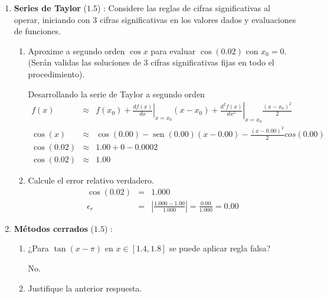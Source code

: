 \documentclass[12pt]{article}
\renewcommand{\sin}{\operatorname{sen}}
\DeclareMathOperator{\sen}{sen}
\renewcommand{\sin}{\sen}
\begin{document}
  \begin{enumerate}[leftmargin=*,widest=9]
    \item \textbf{Series de Taylor} ($1.5$) : Considere las reglas de cifras significativas al operar, iniciando con 3 cifras significativas en los valores dados y evaluaciones de funciones.
    
    \begin{enumerate}[label=\alph*]
    \item Aproxime a segundo orden $\cos x$ para evaluar $\cos (0.02)$ con $x_0 = 0$. 
    (Serán validas las soluciones de 3 cifras significativas fijas en todo el procedimiento).
    
    Desarrollando la serie de Taylor a segundo orden
    \begin{eqnarray*}
    f(x) & \approx & f(x_0) + \left.\frac{df(x)}{dx}\right|_{x=x_0}(x-x_0)+ \left.\frac{d^2f(x)}{dx^2}\right|_{x=x_0}\frac{(x-x_0)^2}{2}\\
    \cos(x) & \approx & \cos(0.00) - \sin(0.00)(x-0.00) - \frac{(x - 0.00)^2}{2}cos(0.00) \\
    \cos(0.02) & \approx & 1.00 + 0 - 0.0002\\
    \cos(0.02) & \approx & 1.00
    \end{eqnarray*}
    
    \item Calcule el error relativo verdadero.
    \begin{eqnarray*}
    \cos(0.02) & = & 1.000\\
    \epsilon_r & = & \left| \frac{1.000 - 1.00}{1.000} \right| = \frac{0.00}{1.000} = 0.00  
    \end{eqnarray*}
    
    \end{enumerate}

    \item \textbf{Métodos cerrados} ($1.5$) :
    
    \begin{enumerate}[label=\alph*]
    \item ¿Para $\tan (x - \pi)$ en $x \in \left[ 1.4, 1.8 \right]$ se puede aplicar regla falsa?
    
    No.
    
    
    
    \item Justifique la anterior respuesta.
    

\end{enumerate}
\end{enumerate}
\end{document}
